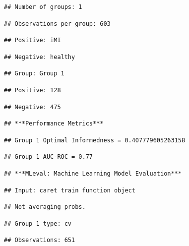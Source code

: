 \documentclass[
]{article}
\begin{document}
\begin{verbatim}
## Number of groups: 1
\end{verbatim}

\begin{verbatim}
## Observations per group: 603
\end{verbatim}

\begin{verbatim}
## Positive: iMI
\end{verbatim}

\begin{verbatim}
## Negative: healthy
\end{verbatim}

\begin{verbatim}
## Group: Group 1
\end{verbatim}

\begin{verbatim}
## Positive: 128
\end{verbatim}

\begin{verbatim}
## Negative: 475
\end{verbatim}

\begin{verbatim}
## ***Performance Metrics***
\end{verbatim}

\begin{verbatim}
## Group 1 Optimal Informedness = 0.407779605263158
\end{verbatim}

\begin{verbatim}
## Group 1 AUC-ROC = 0.77
\end{verbatim}

\begin{verbatim}
## ***MLeval: Machine Learning Model Evaluation***
\end{verbatim}

\begin{verbatim}
## Input: caret train function object
\end{verbatim}

\begin{verbatim}
## Not averaging probs.
\end{verbatim}

\begin{verbatim}
## Group 1 type: cv
\end{verbatim}

\begin{verbatim}
## Observations: 651
\end{verbatim}
\end{document}
